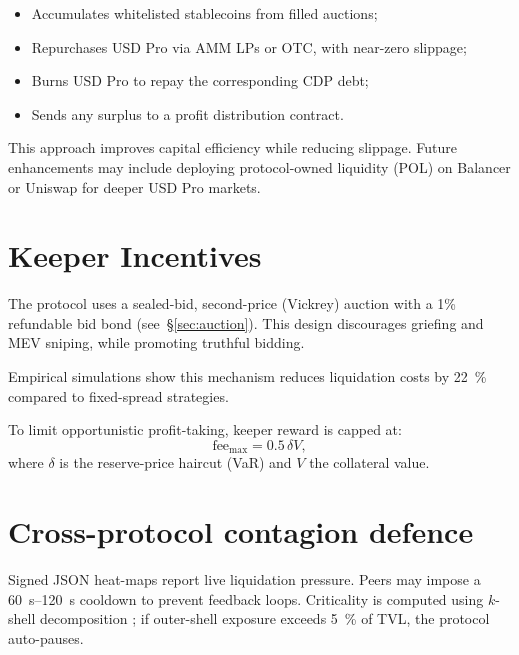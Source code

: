 \documentclass[11pt]{article}
\begin{document}
\begin{itemize}
  \item Accumulates whitelisted stablecoins from filled auctions;
  \item Repurchases USD Pro via AMM LPs or OTC, with near-zero slippage;
  \item Burns USD Pro to repay the corresponding CDP debt;
  \item Sends any surplus to a profit distribution contract.
\end{itemize}

This approach improves capital efficiency while reducing slippage.  
Future enhancements may include deploying protocol-owned liquidity (POL) on Balancer or Uniswap for deeper USD Pro markets.


\section{Keeper Incentives}
The protocol uses a sealed-bid, second-price (Vickrey) auction with a 1\% refundable bid bond (see~§\ref{sec:auction}).  
This design discourages griefing and MEV sniping, while promoting truthful bidding.

Empirical simulations \parencite{tian2025defi} show this mechanism reduces liquidation costs by \SI{22}{\percent} compared to fixed-spread strategies.

To limit opportunistic profit-taking, keeper reward is capped at:
\[
\text{fee}_{\max} = 0.5\,\delta V,
\]
where \( \delta \) is the reserve-price haircut (VaR) and \( V \) the collateral value.


\section{Cross-protocol contagion defence}
\label{sec:contagion}
Signed JSON heat-maps report live liquidation pressure.  
Peers may impose a \SIrange{60}{120}{\second} cooldown to prevent feedback loops.  
Criticality is computed using $k$-shell decomposition \parencite{battiston2016debtrank};  
if outer-shell exposure exceeds \SI{5}{\percent} of TVL, the protocol auto-pauses.

\end{document}
